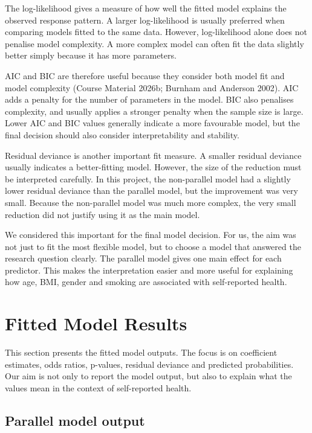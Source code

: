 \documentclass{article}
\begin{document}
The log-likelihood gives a measure of how well the fitted model explains
the observed response pattern. A larger log-likelihood is usually
preferred when comparing models fitted to the same data. However,
log-likelihood alone does not penalise model complexity. A more complex
model can often fit the data slightly better simply because it has more
parameters.

AIC and BIC are therefore useful because they consider both model fit
and model complexity (Course Material 2026b; Burnham and Anderson 2002).
AIC adds a penalty for the number of parameters in the model. BIC also
penalises complexity, and usually applies a stronger penalty when the
sample size is large. Lower AIC and BIC values generally indicate a more
favourable model, but the final decision should also consider
interpretability and stability.

Residual deviance is another important fit measure. A smaller residual
deviance usually indicates a better-fitting model. However, the size of
the reduction must be interpreted carefully. In this project, the
non-parallel model had a slightly lower residual deviance than the
parallel model, but the improvement was very small. Because the
non-parallel model was much more complex, the very small reduction did
not justify using it as the main model.

We considered this important for the final model decision. For us, the
aim was not just to fit the most flexible model, but to choose a model
that answered the research question clearly. The parallel model gives
one main effect for each predictor. This makes the interpretation easier
and more useful for explaining how age, BMI, gender and smoking are
associated with self-reported health.

\section{Fitted Model Results}\label{fitted-model-results}

This section presents the fitted model outputs. The focus is on
coefficient estimates, odds ratios, p-values, residual deviance and
predicted probabilities. Our aim is not only to report the model output,
but also to explain what the values mean in the context of self-reported
health.

\subsection{Parallel model output}\label{parallel-model-output}
\end{document}
